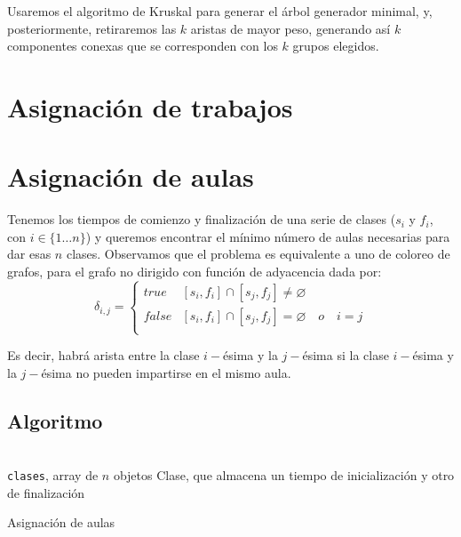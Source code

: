 \documentclass[a4paper, 11pt]{article} %
\let\emptyset\varnothing
\begin{document}
    Usaremos el algoritmo de Kruskal para generar el árbol generador minimal, y, posteriormente, retiraremos las $k$
    aristas de mayor peso, generando así $k$ componentes conexas que se corresponden con los $k$ grupos elegidos.

\section{Asignación de trabajos}

\section{Asignación de aulas}
Tenemos los tiempos de comienzo y finalización de una serie de clases
($s_i$ y $f_i$, con $i\in\{1\ldots n\}$) y queremos encontrar el mínimo número de aulas necesarias
para dar esas $n$ clases.
Observamos que el problema es equivalente a uno de coloreo de grafos, para
el grafo no dirigido con función de adyacencia dada por:
$$\delta_{i,j}=\left\{\begin{array}{ll}
  true  & [s_i,f_i] \cap [s_j,f_j] \neq \emptyset \\
  false  & [s_i,f_i]\cap[s_j,f_j] = \emptyset\quad o\quad i=j\\
  \end{array}\right.$$

Es decir, habrá arista entre la clase $i-$ésima y la $j-$ésima si la
clase $i-$ésima y la $j-$ésima no pueden impartirse en el mismo aula.
  \subsection{Algoritmo}
\begin{algorithm}[H]
	\begin{algorithmic}[1]
		\REQUIRE \ \\
        	\texttt{clases}, array de $n$ objetos Clase, que almacena
				 un tiempo de inicialización y otro de 
				 finalización\\
	  \WHILE{\texttt{sin\_colorear}$\neq \emptyset$}
	      \ENDIF
	    \ENDFOR
	    
	  \ENDWHILE
	\end{algorithmic}
    \caption{Asignación de aulas}
    \label{aulas}
\end{algorithm}
\end{document}

